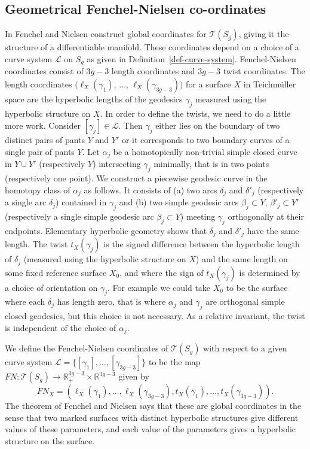 \documentclass[11pt]{amsart}
\numberwithin{equation}{section}
\begin{document}
\subsection{Geometrical Fenchel-Nielsen co-ordinates}\label{sec:geo-FN}

In \cite{F-N} Fenchel and Nielsen construct global coordinates for $\mathcal{T}(S_g)$, giving it the structure of a differentiable 
manifold. These coordinates depend on a choice of a curve system ${\mathcal L}$ on $S_g$ as given in
Definition~\ref{def-curve-system}.
Fenchel-Nielsen coordinates consist of $3g-3$ length coordinates and $3g-3$ twist coordinates. 
The length coordinates $\bigl(\ell_X(\gamma_1),\,\ldots,\,\ell_X(\gamma_{3g-3})\bigr)$ 
for a surface $X$ in Teichm\"uller space are the
hyperbolic lengths of the geodesics $\gamma_j$ measured using the hyperbolic structure on $X$.
In order to define the twists, we need to do a little more work. Consider $[\gamma_j]\in{\mathcal L}$. 
Then $\gamma_j$ either lies on the boundary of two distinct pairs of pants $Y$ and $Y'$ or it
corresponds to two boundary curves of a single pair of pants $Y$. Let $\alpha_j$ be a homotopically non-trivial simple closed 
curve in $Y\cup Y'$ (respectively $Y$) intersecting $\gamma_j$ minimally, that is in two points (respectively one point). 
We construct a piecewise geodesic curve in the homotopy class of $\alpha_j$ as follows. It consists of (a) two arcs $\delta_j$ and 
$\delta'_j$ (respectively a single arc $\delta_j$) contained in $\gamma_j$ and (b) two simple geodesic arcs $\beta_j\subset Y$,
$\beta'_j\subset Y'$ (respectively a single simple geodesic arc $\beta_j\subset Y$) meeting $\gamma_j$ orthogonally at 
their endpoints. 
Elementary hyperbolic geometry shows that $\delta_j$ and $\delta'_j$ have the same length. The twist $t_X(\gamma_j)$ is
the signed difference between the hyperbolic length of $\delta_j$ (measured using the hyperbolic structure on $X$) and the 
same length on some fixed reference surface $X_0$, and where the sign of $t_X(\gamma_j)$ is determined by a 
choice of orientation on $\gamma_j$.
For example we could take $X_0$ to be the surface where each $\delta_j$ has length zero,
that is where $\alpha_j$ and $\gamma_j$ are orthogonal simple closed geodesics, but this choice is not necessary. As a 
relative invariant, the twist is independent of the choice of $\alpha_j$. 

We define the Fenchel-Nielsen coordinates of $\mathcal{T}(S_g)$ with respect to a given 
curve system $\mathcal{L}=\{[\gamma_1],\ldots,[\gamma_{3g-3}]\}$ to be the map 
$FN:\mathcal{T}(S_g)\rightarrow\mathbb{R}_+^{3g-3}\times\mathbb{R}^{3g-3}$ given by
$$
FN_X=(\ell_X(\gamma_1),\ldots,\ell_X(\gamma_{3g-3}),t_X(\gamma_1),\ldots,t_X(\gamma_{3g-3})).
$$
The theorem of Fenchel and Nielsen says that these are global coordinates in the sense that two marked surfaces with 
distinct hyperbolic structures give different values of these parameters, and each value of the parameters gives a hyperbolic
structure on the surface.
\end{document}
